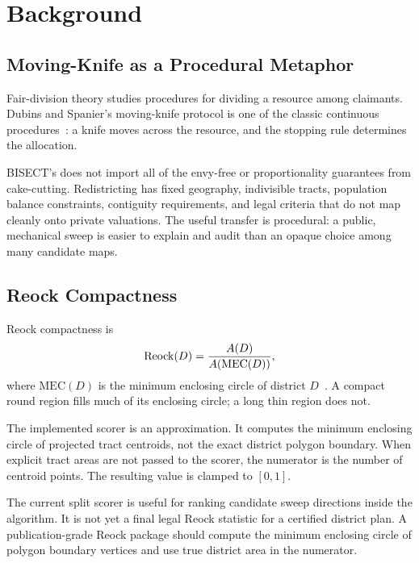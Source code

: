 \section{Background}
\label{sec:background}

\subsection{Moving-Knife as a Procedural Metaphor}

Fair-division theory studies procedures for dividing a resource among
claimants. Dubins and Spanier's moving-knife protocol is one of the classic
continuous procedures~\citep{dubins1961}: a knife moves across the resource,
and the stopping rule determines the allocation.

BISECT's \mka{} does not import all of the envy-free or proportionality
guarantees from cake-cutting. Redistricting has fixed geography, indivisible
tracts, population balance constraints, contiguity requirements, and legal
criteria that do not map cleanly onto private valuations. The useful transfer
is procedural: a public, mechanical sweep is easier to explain and audit than
an opaque choice among many candidate maps.

\subsection{Reock Compactness}
\label{subsec:reock}

Reock compactness is
\begin{equation}
  \mathrm{Reock}{}(D) = \frac{A(D)}{A(\mathrm{MEC}(D))},
  \label{eq:reock}
\end{equation}
where $\mathrm{MEC}(D)$ is the minimum enclosing circle of district
$D$~\citep{reock1961}. A compact round region fills much of its enclosing
circle; a long thin region does not.

The implemented scorer is an approximation. It computes the minimum enclosing
circle of projected tract centroids, not the exact district polygon boundary.
When explicit tract areas are not passed to the scorer, the numerator is the
number of centroid points. The resulting value is clamped to $[0,1]$.

\begin{remark}
\label{rem:centroid-approx}
The current split scorer is useful for ranking candidate sweep directions
inside the algorithm. It is not yet a final legal Reock statistic for a
certified district plan. A publication-grade Reock package should compute the
minimum enclosing circle of polygon boundary vertices and use true district
area in the numerator.
\end{remark}


